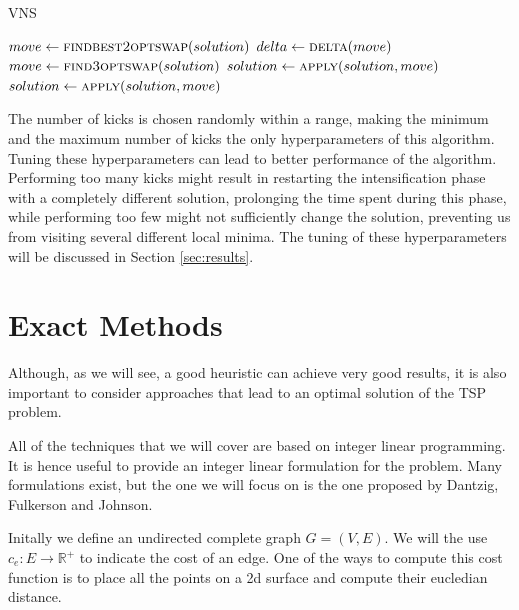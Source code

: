 \documentclass{article}
\begin{document}
\begin{algorithm}[ht]
\caption{VNS}
\label{alg:vns}
\begin{algorithmic}
        \State{}
                \State $move \gets \Call{findbest2optswap}{solution}$
                \State $delta \gets \Call{delta}{move}$
                                \State $move \gets \Call{find3optswap}{solution}$
                                \State $solution \gets \Call{apply}{solution, move}$
                        \EndFor
                \Else
                        \State $solution \gets \Call{apply}{solution, move}$
                \EndIf
        \EndWhile
\EndProcedure
\end{algorithmic}
\end{algorithm}

The number of kicks is chosen randomly within a range, making the minimum and the maximum number
of kicks the only hyperparameters of this algorithm.
Tuning these hyperparameters can lead to better performance of the algorithm. Performing too many
kicks might result in restarting the intensification phase with a completely different solution,
prolonging the time spent during this phase, while performing
too few might not sufficiently change the solution, preventing us from visiting several different local minima.
The tuning of these hyperparameters will be discussed in Section \ref{sec:results}.

\clearpage

\section{Exact Methods}
Although, as we will see, a good heuristic can achieve very good results, it is also
important to consider approaches that lead to an optimal solution of the
TSP problem.

All of the techniques that we will cover are based on integer linear programming. It is
hence useful to provide an integer linear formulation for the problem.
Many formulations exist, but the one we will focus on is the one proposed by
Dantzig, Fulkerson and Johnson. %

Initally we define an undirected complete graph $G=(V, E)$.
We will the use $c_e : E \rightarrow \mathbb{R}^+$ to indicate the cost of
an edge.
One of the ways to compute this cost function is to place all the points
on a 2d surface and compute their eucledian distance.
\end{document}
